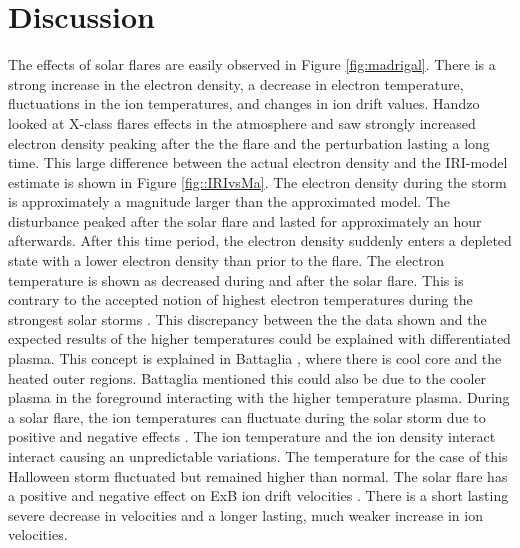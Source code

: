 
\section{Discussion}

The effects of solar flares are easily observed in Figure \ref{fig:madrigal}.
There is a strong increase in the electron density, a decrease in electron temperature, fluctuations in the ion temperatures, and changes in ion drift values.
Handzo \cite{Handzo} looked at X-class flares effects in the atmosphere and saw strongly increased electron density peaking after the the flare and the perturbation lasting a long time. This large difference between the actual electron density and the IRI-model estimate is shown in Figure \ref{fig::IRIvsMa}. The electron density during the storm is approximately a magnitude larger than the approximated model. The disturbance peaked after the solar flare and lasted for approximately an hour afterwards. After this time period, the electron density suddenly enters a depleted state with a lower electron density than prior to the flare.
The electron temperature is shown as decreased during and after the solar flare. This is contrary to the accepted notion of highest electron temperatures during the strongest solar storms \cite{Caspi}. This discrepancy between the the data shown and the expected results of the higher temperatures could be explained with differentiated plasma. This concept is explained in Battaglia \cite{Battaglia}, where there is cool core and the heated outer regions. Battaglia mentioned this could also be due to the cooler plasma in the foreground interacting with the higher temperature plasma.
During a solar flare, the ion temperatures can fluctuate during the solar storm due to positive and negative effects \cite{ITemp}. The ion temperature and the ion density interact interact causing an unpredictable variations. The temperature for the case of this Halloween storm fluctuated but remained higher than normal.
The solar flare has a positive and negative effect on ExB ion drift velocities \cite{IDrift}. There is a short lasting severe decrease in velocities and a longer lasting, much weaker increase in ion velocities.
